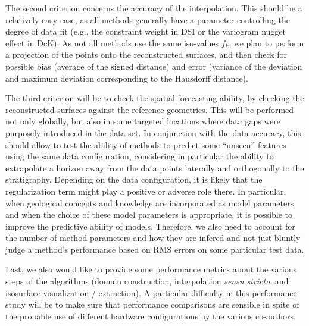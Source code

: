 \documentclass[final]{ring20}
\begin{document}

The second criterion concerns the accuracy of the interpolation. This should be a relatively easy case, as all methods generally have a parameter controlling the degree of data fit (e.g., the constraint weight in DSI or the variogram nugget effect in DcK). As not all methods use the same iso-values $f_k$, we plan to perform a projection of the points onto the reconstructed surfaces, and then check for possible bias (average of the signed distance) and error (variance of the deviation and maximum deviation corresponding to the Hausdorff distance). 

The third criterion will be to check the spatial forecasting ability, by checking the reconstructed surfaces against the reference geometries. This will be performed not only globally, but also in some targeted locations where data gaps were purposely introduced in the data set. In conjunction with the data accuracy, this should allow to test the ability of methods to predict some ``unseen'' features using the same data configuration, considering in particular the ability to extrapolate a horizon away from the data points laterally and orthogonally to the stratigraphy. Depending on the data configuration, it is likely that the regularization term might play a positive or adverse role there. In particular, when geological concepts and knowledge are incorporated as model parameters \citep[e.g.,][]{Laurent2016EaPSL,Grose2017JSG,Grose2018JGRSE,Grose2019JoSG} and when the choice of these model parameters is appropriate, it is possible to improve the predictive ability of models. Therefore, we also need to account for the number of method parameters and how they are infered and not just bluntly judge a method's performance based on RMS errors on some particular test data.  

Last, we also would like to provide some performance metrics about the various steps of the algorithms (domain construction, interpolation \textit{sensu stricto}, and isosurface visualization / extraction). A particular difficulty in this performance study will be to make sure that performance comparisons are sensible in spite of the probable use of different hardware configurations by the various co-authors. 

 
\end{document}
